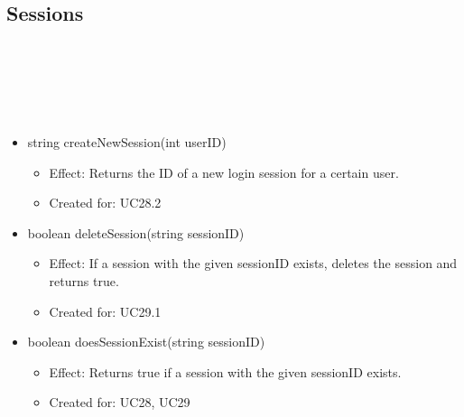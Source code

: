   \subsection{Sessions}\label{int:SessionDBSessions}
    \begin{description}
      \item[Provided by:] \iconcomponent{}~
      \item[Required by:] \iconcomponent{}~
      \item[Operations:] ~
    \begin{itemize}[noitemsep,nolistsep,leftmargin=-.25cm]
      \item \textsf{string createNewSession(int userID)}
        \begin{itemize}[noitemsep,nolistsep]
           \item Effect: Returns the ID of a new login session for a certain user.
\item Created for: UC28.2
        \end{itemize}
      \item \textsf{boolean deleteSession(string sessionID)}
        \begin{itemize}[noitemsep,nolistsep]
           \item Effect: If a session with the given sessionID exists, deletes the session and returns true.
\item Created for: UC29.1
        \end{itemize}
      \item \textsf{boolean doesSessionExist(string sessionID)}
        \begin{itemize}[noitemsep,nolistsep]
           \item Effect: Returns true if a session with the given sessionID exists.
\item Created for: UC28, UC29
        \end{itemize}
    \end{itemize}
    \end{description}

